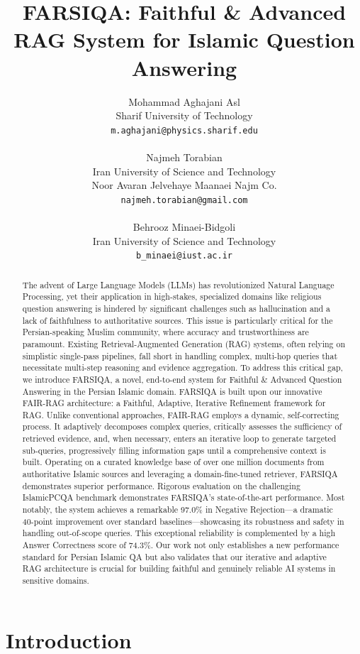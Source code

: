 \documentclass[11pt]{article}
\title{FARSIQA: Faithful \& Advanced RAG System for Islamic Question Answering}
\author{Mohammad Aghajani Asl \\
  Sharif University of Technology \\
  \texttt{m.aghajani@physics.sharif.edu} \\ \\
  Najmeh Torabian \\
  Iran University of Science and Technology \\
  Noor Avaran Jelvehaye Maanaei Najm Co. \\
  \texttt{najmeh.torabian@gmail.com} \\ \\
  Behrooz Minaei-Bidgoli \\
  Iran University of Science and Technology \\
  \texttt{b\_minaei@iust.ac.ir}}
\begin{document}
\maketitle
\begin{abstract}
The advent of Large Language Models (LLMs) has revolutionized Natural Language Processing, yet their application in high-stakes, specialized domains like religious question answering is hindered by significant challenges such as hallucination and a lack of faithfulness to authoritative sources. This issue is particularly critical for the Persian-speaking Muslim community, where accuracy and trustworthiness are paramount. Existing Retrieval-Augmented Generation (RAG) systems, often relying on simplistic single-pass pipelines, fall short in handling complex, multi-hop queries that necessitate multi-step reasoning and evidence aggregation. To address this critical gap, we introduce FARSIQA, a novel, end-to-end system for Faithful \& Advanced Question Answering in the Persian Islamic domain. FARSIQA is built upon our innovative FAIR-RAG\cite{fairrag} architecture: a Faithful, Adaptive, Iterative Refinement framework for RAG. Unlike conventional approaches, FAIR-RAG employs a dynamic, self-correcting process. It adaptively decomposes complex queries, critically assesses the sufficiency of retrieved evidence, and, when necessary, enters an iterative loop to generate targeted sub-queries, progressively filling information gaps until a comprehensive context is built. Operating on a curated knowledge base of over one million documents from authoritative Islamic sources and leveraging a domain-fine-tuned retriever, FARSIQA demonstrates superior performance. Rigorous evaluation on the challenging IslamicPCQA benchmark demonstrates FARSIQA's state-of-the-art performance. Most notably, the system achieves a remarkable 97.0\% in Negative Rejection---a dramatic 40-point improvement over standard baselines---showcasing its robustness and safety in handling out-of-scope queries. This exceptional reliability is complemented by a high Answer Correctness score of 74.3\%. Our work not only establishes a new performance standard for Persian Islamic QA but also validates that our iterative and adaptive RAG architecture is crucial for building faithful and genuinely reliable AI systems in sensitive domains.
\end{abstract}

\section{Introduction}
\end{document}
